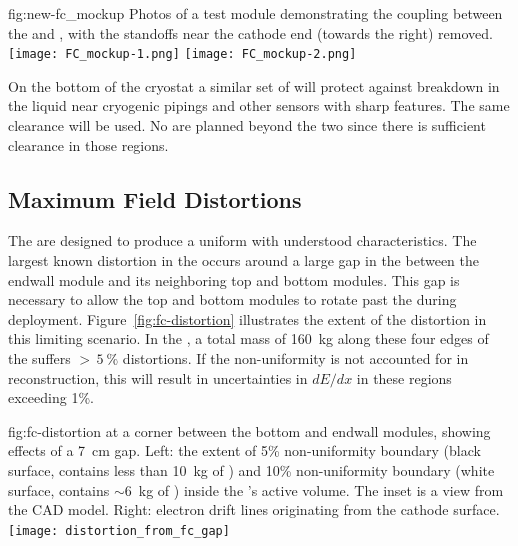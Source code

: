 \begin{dunefigure}
{fig:new-fc_mockup}
{Photos of a test module demonstrating the coupling between the   and , with the standoffs near the cathode end (towards the right) removed.} %
\texttt{[image: FC\_mockup-1.png]}
\texttt{[image: FC\_mockup-2.png]}
\end{dunefigure}

On the bottom of the cryostat a similar set of  %
will protect against %
breakdown in the liquid near cryogenic pipings and other sensors with sharp features. The same clearance will be used. No  are planned beyond the two  since there is sufficient clearance in those regions.  


\subsection{Maximum Field Distortions}
\label{sec:fdsp-hv-des-fc-mfd}

The  are designed to produce a uniform \efield with understood characteristics.
The largest known \efield distortion in the  occurs around a large gap in the  between the endwall module and its neighboring top and bottom modules. This gap is necessary to allow the top and bottom modules to rotate past the  during deployment.  Figure~\ref{fig:fc-distortion} illustrates the extent of the distortion in this limiting scenario. 
In the , a total  mass of \SI{160}{kg} along these four edges of the  suffers $>\,\SI{5}{\%}$ \efield distortions.  If the non-uniformity is not accounted for in reconstruction, this will result in uncertainties in $dE/dx$ in these regions exceeding 1\%. 

\begin{dunefigure}
{fig:fc-distortion}
{\efield at a corner between the bottom and endwall  modules, showing effects of a \SI{7}{cm} gap. Left: the extent of \num{5}\% \efield{} non-uniformity boundary (black surface, contains less than \SI{10}{kg} of ) and \num{10}\% non-uniformity boundary (white surface, contains $\sim$\SI{6}{kg} of ) inside the 's active volume. The inset is a view from the CAD model.  Right: electron drift lines originating from the cathode surface.}
\texttt{[image: distortion\_from\_fc\_gap]}
\end{dunefigure}



